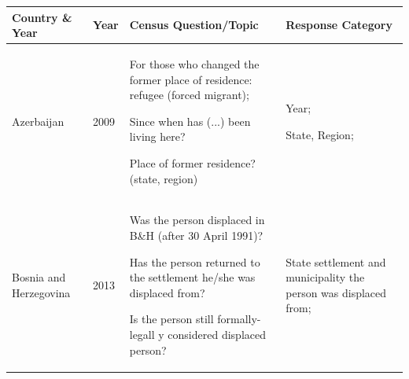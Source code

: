 \documentclass[
]{article}
\begin{document}
\begin{longtable}[]{@{}llll@{}}
\toprule
\begin{minipage}[b]{0.22\columnwidth}\raggedright
Country \& Year\strut
\end{minipage} & \begin{minipage}[b]{0.22\columnwidth}\raggedright
Year\strut
\end{minipage} & \begin{minipage}[b]{0.22\columnwidth}\raggedright
Census
Question/Topic\strut
\end{minipage} & \begin{minipage}[b]{0.22\columnwidth}\raggedright
Response
Category\strut
\end{minipage}\tabularnewline
\midrule
\endhead
\begin{minipage}[t]{0.22\columnwidth}\raggedright
Azerbaijan\strut
\end{minipage} & \begin{minipage}[t]{0.22\columnwidth}\raggedright
2009\strut
\end{minipage} & \begin{minipage}[t]{0.22\columnwidth}\raggedright
For those who
changed the
former place of
residence:
refugee (forced
migrant);

Since when has
(...) been
living here?

Place of former
residence?
(state, region)\strut
\end{minipage} & \begin{minipage}[t]{0.22\columnwidth}\raggedright
Year;

State, Region;\strut
\end{minipage}\tabularnewline
\begin{minipage}[t]{0.22\columnwidth}\raggedright
Bosnia and
Herzegovina\strut
\end{minipage} & \begin{minipage}[t]{0.22\columnwidth}\raggedright
2013\strut
\end{minipage} & \begin{minipage}[t]{0.22\columnwidth}\raggedright
Was the person
displaced in
B\&H (after 30
April 1991)?

Has the person
returned to the
settlement
he/she was
displaced from?

Is the person
still
formally-legall
y
considered
displaced
person?\strut
\end{minipage} & \begin{minipage}[t]{0.22\columnwidth}\raggedright
State
settlement and
municipality
the person was
displaced from;


\end{minipage}
\end{longtable}
\end{document}

